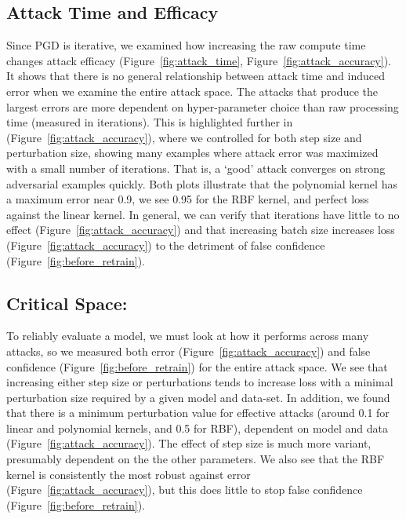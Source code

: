 \documentclass[fonts]{icst}
\begin{document}
\subsection{Attack Time and Efficacy}
Since PGD is iterative, we examined how increasing the raw compute time changes attack efficacy (Figure~\ref{fig:attack_time}, Figure~\ref{fig:attack_accuracy}). It shows that there is no general relationship between attack time and induced error when we examine the entire attack space. The attacks that produce the largest errors are more dependent on hyper-parameter choice than raw processing time (measured in iterations). This is highlighted further in (Figure~\ref{fig:attack_accuracy}), where we controlled for both step size and perturbation size, showing many examples where attack error was maximized with a small number of iterations. That is, a `good' attack converges on strong adversarial examples quickly. Both plots illustrate that the polynomial kernel has a maximum error near 0.9, we see 0.95 for the RBF kernel, and perfect loss against the linear kernel. In general, we can verify that iterations have little to no effect (Figure~\ref{fig:attack_accuracy})  and that increasing batch size increases loss (Figure~\ref{fig:attack_accuracy}) to the detriment of false confidence (Figure~\ref{fig:before_retrain}).


\subsection{Critical Space: }
To reliably evaluate a model, we must look at how it performs across many attacks, so we measured both error (Figure~\ref{fig:attack_accuracy}) and false confidence (Figure~\ref{fig:before_retrain}) for the entire attack space. We see that increasing either step size or perturbations tends to increase loss with a minimal perturbation size required by a given model and data-set. In addition, we found that there is a minimum perturbation value for effective attacks (around 0.1 for linear and polynomial kernels, and 0.5 for RBF), dependent on model and data (Figure~\ref{fig:attack_accuracy}). The effect of step size is much more variant, presumably dependent on the the other parameters. We also see that the RBF kernel is consistently the most robust against error (Figure~\ref{fig:attack_accuracy}), but this does little to stop false confidence (Figure~\ref{fig:before_retrain}). 
\end{document}
